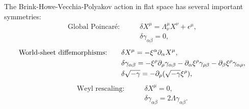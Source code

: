 The Brink-Howe-Vecchia-Polyakov action in flat space has several important symmetries: 
\begin{align}
    \text{Global Poincaré:}\qquad &\delta X^\mu = \Lambda^\mu_\nu X^\nu+\epsilon^\mu,\\
    &\delta \gamma_{\alpha\beta} = 0,
\end{align}
\begin{align}
    \text{World-sheet diffemorphisms:}\qquad &\delta X^\mu = -\xi^\alpha\partial_\alpha X^\mu,\\
    &\delta \gamma_{\alpha\beta} = -\xi^\rho\partial_\rho \gamma_{\alpha\beta}-\partial_\alpha \xi^\rho \gamma_{\rho\beta}-\partial_\beta \xi^\rho \gamma_{\alpha\rho},\\
    &\delta\sqrt{-\gamma} = -\partial_\rho(\sqrt{-\gamma}\xi^\rho),
\end{align}
\begin{align}
    \text{Weyl rescaling:}\qquad &\delta X^\mu = 0,\\
    & \delta \gamma_{\alpha\beta} = 2\Lambda \gamma_{\alpha\beta}.
\end{align}

